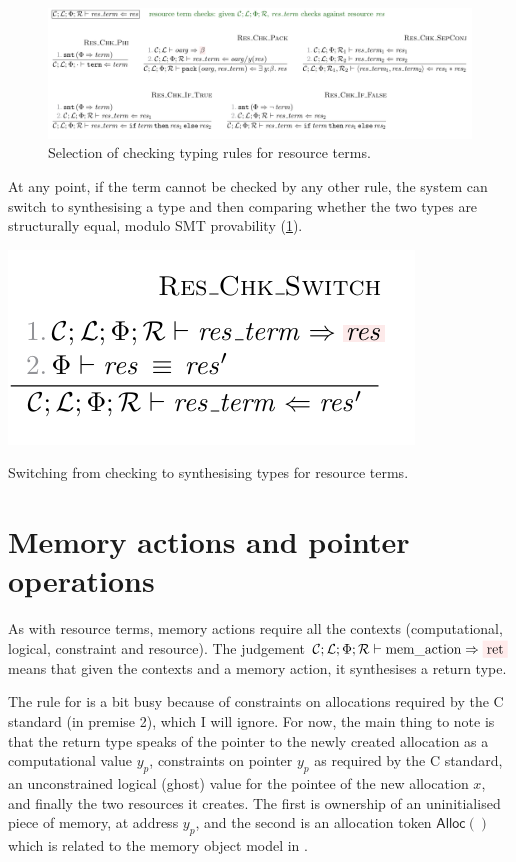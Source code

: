 \begin{figure}[tp]
    \includegraphics{figures/kernel-res-term-check}
    \caption{Selection of  checking typing rules for
        resource terms.}\label{fig:typing-res-term-check}
\end{figure}

At any point, if the term cannot be checked by any other rule, the system can
switch to synthesising a type and then comparing whether the two types are
structurally equal, modulo SMT provability (\cref{fig:typing-res-term-check}).

\begin{marginfigure}
    \includegraphics{figures/kernel-res-term-switch}
    \caption{Switching from checking to synthesising types for resource
        terms.}\label{fig:typing-res-term-switch}
\end{marginfigure}

\section{Memory actions and pointer operations}\label{sec:kernel-mem-action-ops}

As with resource terms, memory actions require all the contexts (computational,
logical, constraint and resource). The judgement $\mathcal{C} ; \mathcal{L} ;
\Phi ; \mathcal{R} \vdash \mathrm{mem\_action} \Rightarrow
\outpol{\mathrm{ret}}$ means that given the contexts and a memory action,
it synthesises a return type.

The rule for  is a bit busy because of %
constraints on allocations required by the C standard (in premise 2), which I
will ignore. For now, the main thing to note is that the return type speaks of
the pointer to the newly created allocation as a computational value $y_p$,
constraints on pointer $y_p$ as required by the C standard, an unconstrained
logical (ghost) value for the pointee of the new allocation $x$, and
finally the two resources it creates. The first is ownership of an
uninitialised piece of memory, at address $y_p$, and the second is an
allocation token $\mathsf{Alloc()}$ which is related to the memory object model
in .

